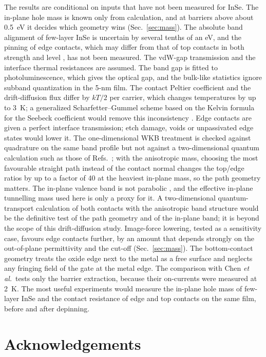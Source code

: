 \documentclass[11pt]{article}
\begin{document}
The results are conditional on inputs that have not been measured for InSe. The in-plane hole mass is known only from calculation, and at barriers above about 0.5~eV it decides which geometry wins (Sec.~\ref{sec:mass}). The absolute band alignment of few-layer InSe is uncertain by several tenths of an eV, and the pinning of edge contacts, which may differ from that of top contacts in both strength and level \cite{refparto}, has not been measured. The vdW-gap transmission and the interface thermal resistances are assumed. The band gap is fitted to photoluminescence, which gives the optical gap, and the bulk-like statistics ignore subband quantization in the 5-nm film. The contact Peltier coefficient and the drift-diffusion flux differ by $kT/2$ per carrier, which changes temperatures by up to 3~K; a generalized Scharfetter--Gummel scheme based on the Kelvin formula for the Seebeck coefficient would remove this inconsistency \cite{refkantner}. Edge contacts are given a perfect interface transmission; etch damage, voids or unpassivated edge states would lower it. The one-dimensional WKB treatment is checked against quadrature on the same band profile but not against a two-dimensional quantum calculation such as those of Refs.~\cite{refszabo,refparto}; with the anisotropic mass, choosing the most favourable straight path instead of the contact normal changes the top/edge ratios by up to a factor of 40 at the heaviest in-plane mass, so the path geometry matters. The in-plane valence band is not parabolic \cite{refceferino}, and the effective in-plane tunnelling mass used here is only a proxy for it. A two-dimensional quantum-transport calculation of both contacts with the anisotropic band structure would be the definitive test of the path geometry and of the in-plane band; it is beyond the scope of this drift-diffusion study. Image-force lowering, tested as a sensitivity case, favours edge contacts further, by an amount that depends strongly on the out-of-plane permittivity and the cut-off (Sec.~\ref{sec:mass}). The bottom-contact geometry treats the oxide edge next to the metal as a free surface and neglects any fringing field of the gate at the metal edge. The comparison with Chen \textit{et al.}\ tests only the barrier extraction, because their on-currents were measured at 2~K. The most useful experiments would measure the in-plane hole mass of few-layer InSe and the contact resistance of edge and top contacts on the same film, before and after depinning.

\section*{Acknowledgements}
\end{document}
